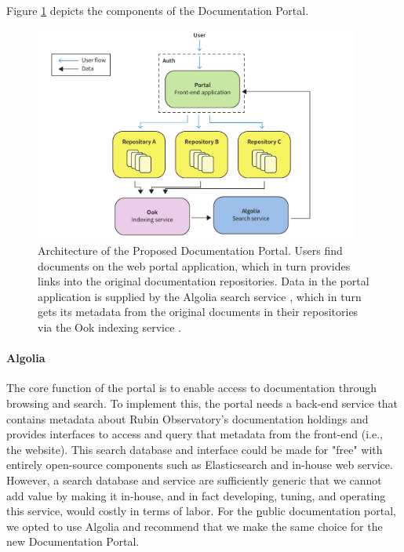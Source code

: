 Figure \ref{fig:portal-architecture} depicts the components of the Documentation Portal.

\begin{figure}[hp!]
\centering
\includegraphics[width=0.95\textwidth]{portal-architecture}
\caption{Architecture of the Proposed Documentation Portal.
Users find documents on the web portal application, which in turn provides links into the original documentation repositories.
Data in the portal application is supplied by the Algolia search service \citep{Algolia-cite}, which in turn gets its metadata from the original documents in their repositories via the Ook indexing service \citep{ook-cite}.}
\label{fig:portal-architecture}
\end{figure}

\paragraph{Algolia}

The core function of the portal is to enable access to documentation through browsing and search.
To implement this, the portal needs a back-end service that contains metadata about Rubin Observatory's documentation holdings and provides interfaces to access and query that metadata from the front-end (i.e., the website).
This search database and interface could be made for "free" with entirely open-source components such as Elasticsearch \citep{elastic-cite} and in-house web service.
However, a search database and service are sufficiently generic that we cannot add value by making it in-house, and in fact developing, tuning, and operating this service, would costly in terms of labor.
For the \href{www.lsst.io} public documentation portal, we opted to use Algolia and recommend that we make the same choice for the new Documentation Portal.

